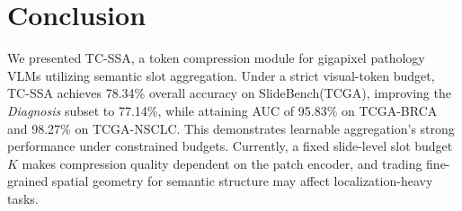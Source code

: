 \documentclass[runningheads]{llncs}
\begin{document}
\section{Conclusion}
\label{sec:conclusion}

We presented \textsc{TC-SSA}, a token compression module for gigapixel pathology VLMs utilizing semantic slot aggregation. Under a strict visual-token budget, \textsc{TC-SSA} achieves 78.34\% overall accuracy on SlideBench(TCGA), improving the \textit{Diagnosis} subset to 77.14\%, while attaining AUC of 95.83\% on TCGA-BRCA and 98.27\% on TCGA-NSCLC. This demonstrates learnable aggregation's strong performance under constrained budgets. Currently, a fixed slide-level slot budget $K$ makes compression quality dependent on the patch encoder, and trading fine-grained spatial geometry for semantic structure may affect localization-heavy tasks.

\renewcommand{\bibname}{References}



\appendix
\end{document}
